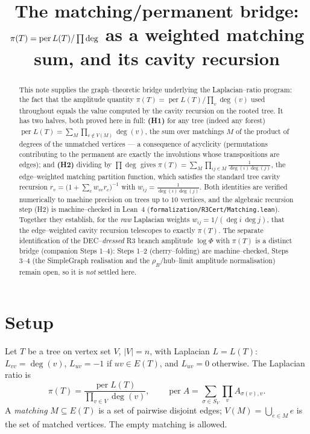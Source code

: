 \documentclass[11pt]{article}
\title{The matching/permanent bridge:\\
$\pi(T)=\per L(T)/\prod\deg$ as a weighted matching sum, and its cavity recursion}
\author{}
\date{}
\newcommand{\per}{\operatorname{per}}
\begin{document}
\maketitle

\begin{abstract}
This note supplies the graph--theoretic bridge underlying the Laplacian--ratio program: the fact that the
amplitude quantity $\pi(T)=\per L(T)/\prod_v\deg(v)$ used throughout equals the value computed by the cavity
recursion on the rooted tree. It has two halves, both proved here in full: \textbf{(H1)} for any tree (indeed
any forest) $\per L(T)=\sum_{M}\prod_{v\notin V(M)}\deg(v)$, the sum over matchings $M$ of the product of
degrees of the unmatched vertices --- a consequence of acyclicity (permutations contributing to the permanent
are exactly the involutions whose transpositions are edges); and \textbf{(H2)} dividing by $\prod\deg$ gives
$\pi(T)=\sum_M\prod_{ij\in M}\tfrac1{\deg(i)\deg(j)}$, the edge--weighted matching partition function, which
satisfies the standard tree cavity recursion $r_v=\bigl(1+\sum_{c}w_{vc}r_c\bigr)^{-1}$ with
$w_{ij}=\tfrac1{\deg(i)\deg(j)}$. Both identities are verified numerically to machine precision on trees up to
$10$ vertices, and the algebraic recursion step (H2) is machine--checked in Lean~4
(\texttt{formalization/R3Cert/Matching.lean}). Together they establish, for the \emph{raw} Laplacian weights
$w_{ij}=1/(\deg i\,\deg j)$, that the edge--weighted cavity recursion telescopes to exactly $\pi(T)$. The
separate identification of the DEC--\emph{dressed} R3 branch amplitude $\log\Phi$ with $\pi(T)$ is a distinct
bridge (companion Steps 1--4): Steps 1--2 (cherry--folding) are machine--checked, Steps 3--4 (the SimpleGraph
realisation and the $\rho_B$/hub--limit amplitude normalisation) remain open, so it is \emph{not} settled here.
\end{abstract}

\section{Setup}

Let $T$ be a tree on vertex set $V$, $|V|=n$, with Laplacian $L=L(T)$: $L_{vv}=\deg(v)$, $L_{uv}=-1$ if
$uv\in E(T)$, and $L_{uv}=0$ otherwise. The Laplacian ratio is
\[
  \pi(T)=\frac{\per L(T)}{\prod_{v\in V}\deg(v)},\qquad \per A=\sum_{\sigma\in S_V}\prod_{v}A_{\sigma(v),v}.
\]
A \emph{matching} $M\subseteq E(T)$ is a set of pairwise disjoint edges; $V(M)=\bigcup_{e\in M}e$ is the set of
matched vertices. The empty matching is allowed.
\end{document}
